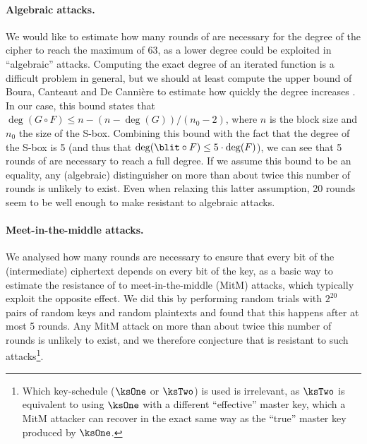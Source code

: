 \paragraph{Algebraic attacks.}
We would like to estimate how many rounds of \fly are necessary for the degree of the cipher to reach the maximum of 63, as a lower degree could be exploited in
``algebraic'' attacks. Computing the exact degree of an iterated function is a difficult problem in general, but we should at least compute the upper bound of Boura, Canteaut and De Cannière
to estimate how quickly the degree increases \cite{permdegree}. In our case, this bound states that $\deg(G \circ F) \leq n - (n - \deg(G))/(n_0 - 2)$, where $n$ is the block size and $n_0$ the
size of the S-box. Combining this bound with the fact that the degree of the S-box is 5 (and thus that $\deg(\blit \circ F) \leq 5\cdot\deg(F)$), we can see that 5 rounds of
\fly are necessary to reach a full degree. If we assume this bound to be an equality, any (algebraic) distinguisher on more than about twice this number of rounds is unlikely to exist. 
Even when relaxing this latter assumption, 20 rounds seem to be well enough to make \fly resistant to algebraic attacks.

\paragraph{Meet-in-the-middle attacks.}
We analysed how many rounds are necessary to ensure that every bit of the (intermediate) ciphertext depends on every bit of the key, as a basic way to estimate the resistance
of \fly to meet-in-the-middle (MitM) attacks, which typically exploit the opposite effect. We did this by performing random trials with $2^{20}$ pairs of random
keys and random plaintexts and found that this happens after at most 5 rounds. Any MitM attack on more than about twice this number of rounds is unlikely to exist, and
we therefore conjecture that \fly is resistant to such attacks\footnote{Which key-schedule ($\ksOne$ or $\ksTwo$) is used is irrelevant, as $\ksTwo$ is equivalent to
using $\ksOne$ with a different ``effective'' master key, which a MitM attacker can recover in the exact same way as the ``true'' master key produced by $\ksOne$.}.

